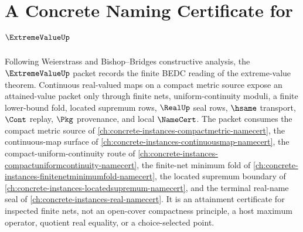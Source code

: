 \chapter{A Concrete Naming Certificate for $\ExtremeValueUp$}
\label{ch:concrete-instances-extremevalue-namecert}

Following Weierstrass and Bishop--Bridges constructive analysis, the $\ExtremeValueUp$ packet records the finite BEDC reading of the extreme-value theorem. Continuous real-valued maps on a compact metric source expose an attained-value packet only through finite nets, uniform-continuity moduli, a finite lower-bound fold, located supremum rows, $\RealUp$ seal rows, $\hsame$ transport, $\Cont$ replay, $\Pkg$ provenance, and local $\NameCert$. The packet consumes the compact metric source of \autoref{ch:concrete-instances-compactmetric-namecert}, the continuous-map surface of \autoref{ch:concrete-instances-continuousmap-namecert}, the compact-uniform-continuity route of \autoref{ch:concrete-instances-compactuniformcontinuity-namecert}, the finite-net minimum fold of \autoref{ch:concrete-instances-finitenetminimumfold-namecert}, the located supremum boundary of \autoref{ch:concrete-instances-locatedsupremum-namecert}, and the terminal real-name seal of \autoref{ch:concrete-instances-real-namecert}. It is an attainment certificate for inspected finite nets, not an open-cover compactness principle, a host maximum operator, quotient real equality, or a choice-selected point.

